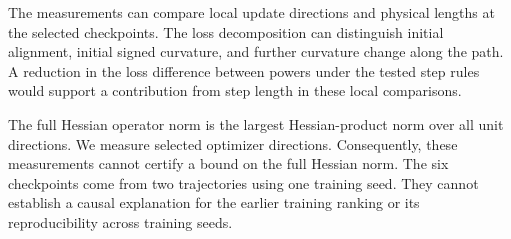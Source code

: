 \documentclass[
  14pt,
  letterpaper,
]{extarticle}
\begin{document}
The measurements can compare local update directions and physical
lengths at the selected checkpoints. The loss decomposition can
distinguish initial alignment, initial signed curvature, and further
curvature change along the path. A reduction in the loss difference
between powers under the tested step rules would support a contribution
from step length in these local comparisons.

The full Hessian operator norm is the largest Hessian-product norm over
all unit directions. We measure selected optimizer directions.
Consequently, these measurements cannot certify a bound on the full
Hessian norm. The six checkpoints come from two trajectories using one
training seed. They cannot establish a causal explanation for the
earlier training ranking or its reproducibility across training seeds.
\end{document}
